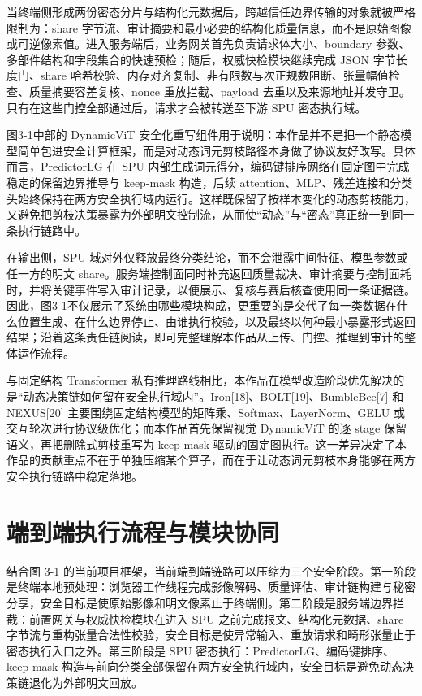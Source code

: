 当终端侧形成两份密态分片与结构化元数据后，跨越信任边界传输的对象就被严格限制为：share 字节流、审计摘要和最小必要的结构化质量信息，而不是原始图像或可逆像素值。进入服务端后，业务网关首先负责请求体大小、boundary 参数、多部件结构和字段集合的快速预检；随后，权威快检模块继续完成 JSON 字节长度门、share 哈希校验、内存对齐复制、非有限数与次正规数阻断、张量幅值检查、质量摘要容差复核、nonce 重放拦截、payload 去重以及来源地址并发守卫。只有在这些门控全部通过后，请求才会被转送至下游 SPU 密态执行域。

图3-1中部的 DynamicViT 安全化重写组件用于说明：本作品并不是把一个静态模型简单包进安全计算框架，而是对动态词元剪枝路径本身做了协议友好改写。具体而言，PredictorLG 在 SPU 内部生成词元得分，编码键排序网络在固定图中完成稳定的保留边界推导与 keep-mask 构造，后续 attention、MLP、残差连接和分类头始终保持在两方安全执行域内运行。这样既保留了按样本变化的动态剪枝能力，又避免把剪枝决策暴露为外部明文控制流，从而使“动态”与“密态”真正统一到同一条执行链路中。

在输出侧，SPU 域对外仅释放最终分类结论，而不会泄露中间特征、模型参数或任一方的明文 share。服务端控制面同时补充返回质量裁决、审计摘要与控制面耗时，并将关键事件写入审计记录，以便展示、复核与赛后核查使用同一条证据链。因此，图3-1不仅展示了系统由哪些模块构成，更重要的是交代了每一类数据在什么位置生成、在什么边界停止、由谁执行校验，以及最终以何种最小暴露形式返回结果；沿着这条责任链阅读，即可完整理解本作品从上传、门控、推理到审计的整体运作流程。

与固定结构 Transformer 私有推理路线相比，本作品在模型改造阶段优先解决的是“动态决策链如何留在安全执行域内”。Iron[18]、BOLT[19]、BumbleBee[7] 和 NEXUS[20] 主要围绕固定结构模型的矩阵乘、Softmax、LayerNorm、GELU 或交互轮次进行协议级优化；而本作品首先保留视觉 DynamicViT 的逐 stage 保留语义，再把删除式剪枝重写为 keep-mask 驱动的固定图执行。这一差异决定了本作品的贡献重点不在于单独压缩某个算子，而在于让动态词元剪枝本身能够在两方安全执行链路中稳定落地。

\section{端到端执行流程与模块协同}

结合图 3-1 的当前项目框架，当前端到端链路可以压缩为三个安全阶段。第一阶段是终端本地预处理：浏览器工作线程完成影像解码、质量评估、审计链构建与秘密分享，安全目标是使原始影像和明文像素止于终端侧。第二阶段是服务端边界拦截：前置网关与权威快检模块在进入 SPU 之前完成报文、结构化元数据、share 字节流与重构张量合法性校验，安全目标是使异常输入、重放请求和畸形张量止于密态执行入口之外。第三阶段是 SPU 密态执行：PredictorLG、编码键排序、keep-mask 构造与前向分类全部保留在两方安全执行域内，安全目标是避免动态决策链退化为外部明文回放。

